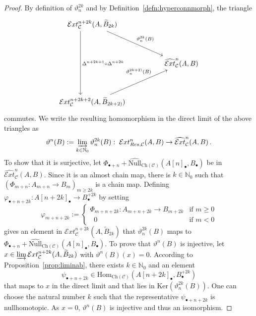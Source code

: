 \documentclass[12pt,a4paper]{article}
\numberwithin{equation}{section}
\theoremstyle{nonumberplain}
\newtheorem{proof}{Proof}
\begin{document}
\begin{proof}
By definition of $\vartheta_{n}^{2k}$ and by Definition~\ref{defn:hyperconnmorph}, the triangle
\begin{equation}\label{diag:thetadeltatriangle}
\begin{tikzcd}
  \mathcal{E}xt_{\mathcal{C}}^{n+2k}(A{,} \, \widetilde{B}_{2k}) \arrow[ddrr, "\vartheta_{n}^{2k}(B)"] \arrow[dddd, shift right = 6mm, "\Delta^{n+2k+1} \circ \Delta^{n+2k}"] & & {} \\ \\
  {} & & \widehat{\mathcal{E}xt}_{\mathcal{C}}^n(A{,} \, B) \\ \\
  \mathcal{E}xt_{\mathcal{C}}^{n+2k+2}(A{,} \, \widetilde{B}_{2k+2)}) \arrow[uurr, "\vartheta_{n}^{2k+2)}(B)" near end] & & {}
\end{tikzcd}
\end{equation}
commutes. We write the resulting homomorphism in the direct limit of the above triangles as
\[ \vartheta^n(B) := \varinjlim_{k \in \mathbb{N}_0} \vartheta_{n}^{2k}(B): \; \mathcal{E}xt_{Res, \mathcal{C}}^n(A, B) \rightarrow \widehat{\mathcal{E}xt}_{\mathcal{C}}^n(A, B) \, . \]
To show that it is surjective, let $\Phi_{\bullet+n}+\widehat{\mathrm{Null}}_{\mathrm{Ch}(\mathcal{C})}(A[n]_{\bullet}, B_{\bullet})$ be in $\widehat{\mathcal{E}xt}_{\mathcal{C}}^n(A, B)$. Since it is an almost chain map, there is $k \in \mathbb{N}_0$ such that $(\Phi_{m+n}: A_{m+n} \rightarrow B_m)_{m \geq 2k}$ is a chain map. Defining $\varphi_{\bullet+n+2k}: A[n+2k]_{\bullet} \rightarrow B_{\bullet}^{+2k}$ by setting
\[ \varphi_{m+n+2k} := \begin{cases}\Phi_{m+n+2k}: A_{m+n+2k} \rightarrow B_{m+2k} &\text{if } m \geq 0 \\ \; \; 0 &\text{if } m < 0 \end{cases} \]
gives an element in $\mathcal{E}xt_{\mathcal{C}}^{n+2k}(A, \widetilde{B}_{2k})$ that $\vartheta_{n}^{2k}(B)$ maps to $\Phi_{\bullet+n} + \widehat{\mathrm{Null}}_{\mathrm{Ch}(\mathcal{C})}(A[n]_{\bullet}, B_{\bullet})$. To prove that $\vartheta^n(B)$ is injective, let $x \in \varinjlim  \mathcal{E}xt_{\mathcal{C}}^{n+2k}(A, \widetilde{B}_{2k})$ with $\vartheta^n(B)(x) = 0$. According to Proposition~\ref{prop:liminab}, there exists $k \in \mathbb{N}_0$ and an element
\[  \psi_{\bullet+n+2k} \in \mathrm{Hom}_{\mathrm{Ch}(\mathcal{C})}(A[n+2k]_{\bullet}, B_{\bullet}^{+2k}) \]
that maps to $x$ in the direct limit and that lies in $\mathrm{Ker}(\vartheta_n^{2k}(B))$. One can choose the natural number $k$ such that the representative $\psi_{\bullet+n+2k}$ is nullhomotopic. As $x = 0$, $\vartheta^n(B)$ is injective and thus an isomorphism.
\end{proof}
\end{document}
